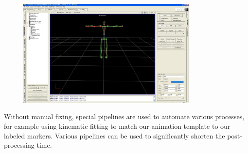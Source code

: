\begin{figure}[H]
  \centering
  \includegraphics[width=90mm]{images/vicon.jpg}
\end{figure}

Without manual fixing, special pipelines are used to automate various processes, for example using kinematic fitting to match our animation template to our labeled markers. Various pipelines can be used to significantly shorten the post-processing time.